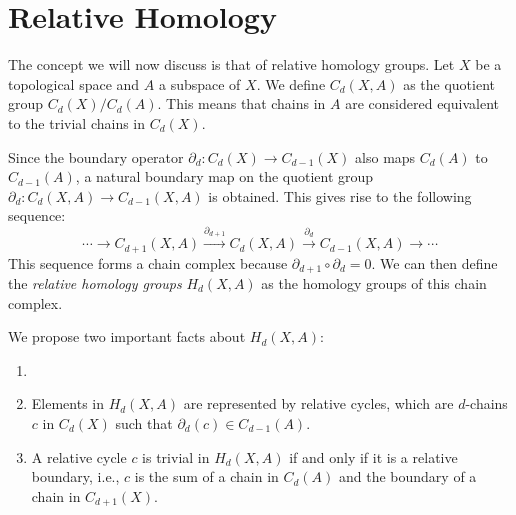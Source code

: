 \section{Relative Homology}
\label{RelativeHomology}
The concept we will now discuss is that of relative
homology groups. Let $X$ be a topological space and $A$ a subspace of $X$. We
define $C_{d}(X,A)$ as the quotient group $C_{d}(X)/C_{d}(A)$. This means that chains
in $A$ are considered equivalent to the trivial chains in $C_{d}(X)$.

Since the boundary operator $\partial_{d}: C_{d}(X) \rightarrow C_{d-1}(X)$ also
maps $C_{d}(A)$ to $C_{d-1}(A)$, a natural boundary map on the quotient group
$\partial_{d}: C_{d}(X,A) \rightarrow C_{d-1}(X,A)$ is obtained. This gives rise
to the following sequence:
\begin{equation}
	\cdots \xrightarrow{}C_{d+1}(X,A) \xrightarrow{\partial_{d+1}}C_{d}(X,A) \xrightarrow
	{\partial_d}C_{d-1}(X,A) \xrightarrow{}\cdots
\end{equation}
This sequence forms a chain complex because
$\partial_{d+1}\circ \partial_{d}= 0$. We can then define the \emph{relative
homology groups} $H_{d}(X,A)$ as the homology groups of this chain complex.

We propose two important facts about $H_{d}(X,A)$:

\begin{proposition}
	\begin{enumerate}
		\item[]

		\item Elements in $H_{d}(X,A)$ are represented by relative cycles, which are
			$d$-chains $c$ in $C_{d}(X)$ such that $\partial_{d}(c) \in C_{d-1}(A)$.

		\item A relative cycle $c$ is trivial in $H_{d}(X,A)$ if and only if it is a
			relative boundary, i.e., $c$ is the sum of a chain in $C_{d}(A)$ and the
			boundary of a chain in $C_{d+1}(X)$.
	\end{enumerate}
\end{proposition}

